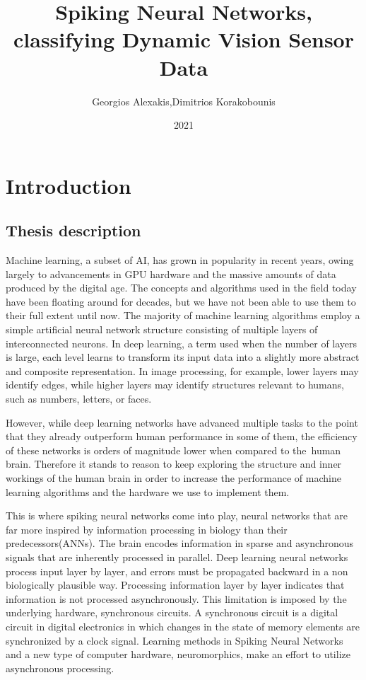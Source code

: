 \documentclass{report}
\title{Spiking Neural Networks, classifying Dynamic Vision Sensor Data }
\author{Georgios Alexakis,Dimitrios Korakobounis}
\date{2021}
\begin{document}
\maketitle

\tableofcontents{}
\chapter{Introduction}
     
\section{Thesis description}
Machine learning, a subset of AI, has grown in popularity in recent years, owing largely to advancements in GPU hardware and the massive amounts of data produced by the digital age. The concepts and algorithms used in the field today have been floating around for decades, but we have not been able to use them to their full extent until now. The majority of machine learning algorithms employ a simple artificial neural network structure consisting of multiple layers of interconnected neurons. In deep learning, a term used when the number of layers is large, each level learns to transform its input data into a slightly more abstract and composite representation. In image processing, for example, lower layers may identify edges, while higher layers may identify structures relevant to humans, such as numbers, letters, or faces.

However, while deep learning networks have advanced multiple tasks to the point that they already outperform human performance in some of them, the efficiency of these networks is orders of magnitude lower when compared to the human brain. Therefore it stands to reason to keep exploring the structure and inner workings of the human brain in order to increase the performance of machine learning algorithms and the hardware we use to implement them. 

This is where spiking neural networks come into play, neural networks that are far more inspired by information processing in biology than their predecessors(ANNs). The brain encodes information in sparse and asynchronous signals that are inherently processed in parallel. Deep learning neural networks process input layer by layer, and errors must be propagated backward in a non biologically plausible way. Processing information layer by layer indicates that information is not processed asynchronously. This limitation is imposed by the underlying hardware, synchronous circuits. A synchronous circuit is a digital circuit in digital electronics in which changes in the state of memory elements are synchronized by a clock signal. Learning methods in Spiking Neural Networks and a new type of computer hardware, neuromorphics, make an effort to utilize asynchronous processing.
\end{document}
